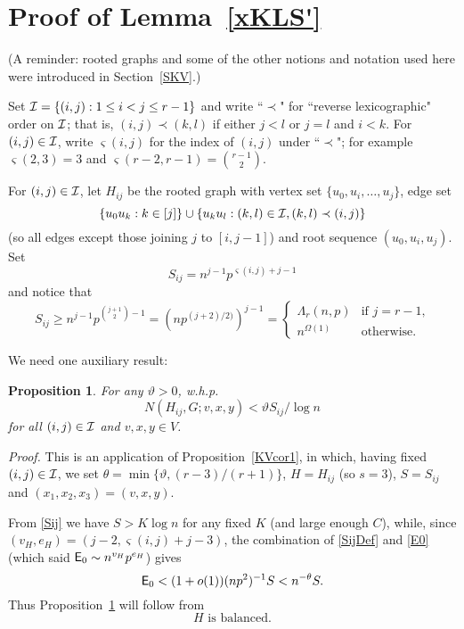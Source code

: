 \documentclass[letterpaper,11pt]{article}
\newtheorem{prop}[thm]{Proposition}
\newcommand{\beq}[1]{\begin{equation}\label{#1}}
\newcommand{\enq}[0]{\end{equation}}
\newcommand{\mn}[0]{\medskip\noindent}
\newcommand{\nin}[0]{\noindent}
\renewcommand{\dots}[0]{,\ldots,}
\newcommand{\I}[0]{{\cal I}}
\newcommand{\0}[0]{\emptyset}
\newcommand{\C}[2]{{{#1}\choose{{#2}}}}
\newcommand{\gL}[0]{\Lambda}
\newcommand{\gO}[0]{\Omega}
\newcommand{\vt}[0]{\vartheta}
\newcommand{\vs}[0]{\varsigma}
\newcommand{\glr}[0]{\gL_r(n,p)}
\begin{document}
\section{Proof of Lemma~\ref{xKLS'}}\label{PLxKLS'}


(A reminder:
rooted graphs and some of the other notions and notation used
here were introduced in Section~\ref{SKV}.)


Set $\I=\{(i,j):1\leq i<j\leq r-1\}$ and
write ``$\prec$" for ``reverse lexicographic" order on
$\I$; that is, $(i,j)\prec (k,l)$ if either
$j<l$ or $j=l$ and $i<k$.
%
For $(i,j)\in \I$, write
$\vs(i,j)$ for the index of $(i,j)$ under ``$\prec$";
for example $\vs(2,3)=3$ and $\vs(r-2,r-1)=\C{r-1}{2}$.


For $(i,j)\in \I$,
let $H_{ij}$
be the rooted graph
with vertex set $\{u_0,u_i\dots u_j\}$, edge set
\[\{u_0u_k:k\in [j]\}\cup\{u_ku_l: (k,l)\in \I,(k,l)\prec (i,j)\}\]
(so all edges except those joining $j$ to $[i,j-1]$)
and root sequence $(u_0,u_i,u_j)$.
%
Set
\beq{SijDef}
S_{ij} = n^{j-1}p^{\vs(i,j)+j-1}
\enq
and notice that
\beq{Sij}
S_{ij} \geq  n^{j-1}p^{\C{j+1}{2}-1}
=(np^{(j+2)/2)})^{j-1} =
\left\{\begin{array}{ll}
\glr &\mbox{if $j=r-1$,}\\
n^{\gO(1)} &\mbox{otherwise.}
\end{array}\right.
\enq   %

We need one auxiliary result:
\begin{prop} \label{VuCor}
For any $\vt>0$,  %
w.h.p.
\[N(H_{ij},G;v,x,y) < \vt S_{ij}/\log n\]
for all $(i,j)\in \I$ and $v,x,y\in V$.
\end{prop}
\nin


\mn
{\em Proof.}
This is an application of Proposition~\ref{KVcor1},
in which, having fixed $(i,j)\in\I$, we set
$\theta= \min\{\vt,(r-3)/(r+1)\}$,
$H=H_{ij}$ (so $s=3$), $S=S_{ij}$ and $(x_1,x_2,x_3)=(v,x,y)$.

From \eqref{Sij} we have $S> K\log n$ for any fixed $K$
(and large enough $C$), while,
since $(v_H,e_H) = (j-2, \vs(i,j)+j-3)$,
the combination of \eqref{SijDef}
and \eqref{E0}
(which said ${\sf E}_0\sim n^{v_H}p^{e_H}$)
gives
\[
{\sf E}_0 < (1+o(1))(np^2)^{-1}S < n^{-\theta}S.
\]
Thus Proposition~\ref{VuCor} will follow from
%
\beq{Hisbal}
\mbox{$H$ is balanced.}
\enq
\end{document}
